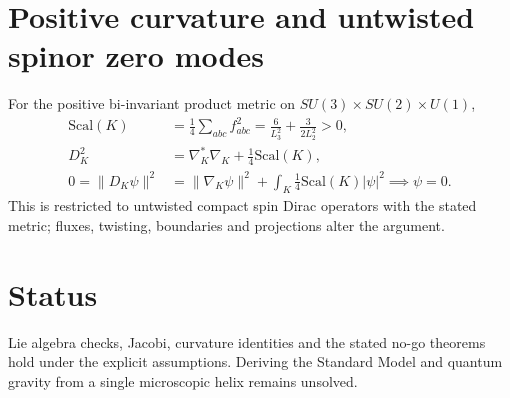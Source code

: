 \documentclass[11pt]{article}
\begin{document}
\section{Positive curvature and untwisted spinor zero modes}
For the positive bi-invariant product metric on $SU(3)\times SU(2)\times U(1)$,
\begin{align}
\mathrm{Scal}(K)&=\frac{1}{4}\sum_{abc}f_{abc}^2=\frac{6}{L_3^2}+\frac{3}{2L_2^2}>0,\\
D_K^2&=\nabla_K^*\nabla_K+\frac14\mathrm{Scal}(K),\\
0=\|D_K\psi\|^2&=\|\nabla_K\psi\|^2+\int_K\frac14\mathrm{Scal}(K)|\psi|^2\implies\psi=0.
\end{align}
This is restricted to untwisted compact spin Dirac operators with the stated metric; fluxes, twisting, boundaries and projections alter the argument.
\section{Status}
Lie algebra checks, Jacobi, curvature identities and the stated no-go theorems hold under the explicit assumptions. Deriving the Standard Model and quantum gravity from a single microscopic helix remains unsolved.
\end{document}
